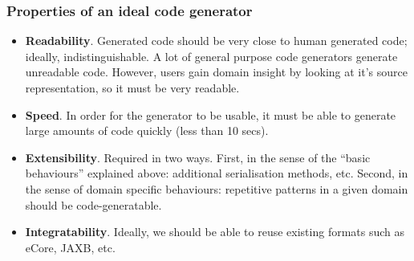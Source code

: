\documentclass{beamer}
\begin{document}
\begin{frame}
\frametitle{Properties of an ideal code generator}

\begin{itemize}

\item \textbf{Readability}. Generated code should be very close to human
  generated code; ideally, indistinguishable. A lot of general purpose
  code generators generate unreadable code. However, users gain domain
  insight by looking at it's source representation, so it must be very
  readable.

\pause

\item \textbf{Speed}. In order for the generator to be usable, it must
  be able to generate large amounts of code quickly (less than 10
  secs).

\pause

\item \textbf{Extensibility}. Required in two ways. First, in the
  sense of the ``basic behaviours'' explained above: additional
  serialisation methods, etc. Second, in the sense of domain specific
  behaviours: repetitive patterns in a given domain should be
  code-generatable.

\pause

\item \textbf{Integratability}. Ideally, we should be able to reuse
  existing formats such as eCore, JAXB, etc.

\end{itemize}

\end{frame}
\end{document}
